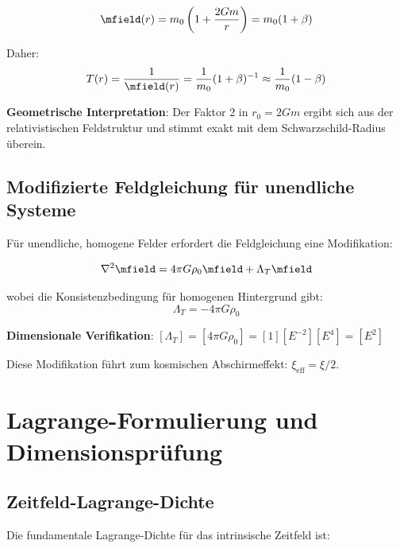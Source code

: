 	\begin{equation}
		\mfield(r) = m_0\left(1 + \frac{2Gm}{r}\right) = m_0(1 + \beta)
		\label{eq:massenfeld_loesung}
	\end{equation}
	
	Daher:
	\begin{equation}
		T(r) = \frac{1}{\mfield(r)} = \frac{1}{m_0}(1 + \beta)^{-1} \approx \frac{1}{m_0}(1 - \beta)
		\label{eq:zeitfeld_loesung}
	\end{equation}
	
	\textbf{Geometrische Interpretation}: Der Faktor 2 in $r_0 = 2Gm$ ergibt sich aus der relativistischen Feldstruktur und stimmt exakt mit dem Schwarzschild-Radius überein.
	
	\subsection{Modifizierte Feldgleichung für unendliche Systeme}
	\label{subsec:unendliche_systeme}
	
	Für unendliche, homogene Felder erfordert die Feldgleichung eine Modifikation:
	
	\begin{equation}
		\nabla^2 \mfield = 4\pi G \rho_0 \mfield + \Lambda_T \mfield
		\label{eq:modifizierte_feldgleichung}
	\end{equation}
	
	wobei die Konsistenzbedingung für homogenen Hintergrund gibt:
	\begin{equation}
		\Lambda_T = -4\pi G \rho_0
		\label{eq:lambda_t_definition}
	\end{equation}
	
	\textbf{Dimensionale Verifikation}: $[\Lambda_T] = [4\pi G \rho_0] = [1][E^{-2}][E^4] = [E^2]$ \checkmark
	
	Diese Modifikation führt zum kosmischen Abschirmeffekt: $\xi_{\text{eff}} = \xi/2$.
	
	\section{Lagrange-Formulierung und Dimensionsprüfung}
	\label{sec:lagrange_formulierung}
	
	\subsection{Zeitfeld-Lagrange-Dichte}
	\label{subsec:zeitfeld_lagrange}
	
	Die fundamentale Lagrange-Dichte für das intrinsische Zeitfeld ist:
	
